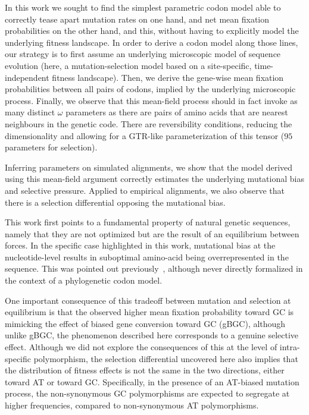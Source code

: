 \documentclass{article}
\begin{document}
In this work we sought to find the simplest parametric codon model able to correctly tease apart mutation rates on one hand, and net mean fixation probabilities on the other hand, and this, without having to explicitly model the underlying fitness landscape.
In order to derive a codon model along those lines, our strategy is to first assume an underlying microscopic model of sequence evolution (here, a mutation-selection model based on a site-specific, time-independent fitness landscape).
Then, we derive the gene-wise mean fixation probabilities between all pairs of codons, implied by the underlying microscopic process.
Finally, we observe that this mean-field process should in fact invoke as many distinct $\omega$ parameters as there are pairs of amino acids that are nearest neighbours in the genetic code.
There are reversibility conditions, reducing the dimensionality and allowing for a GTR-like parameterization of this tensor ($95$ parameters for selection).

Inferring parameters on simulated alignments, we show that the model derived using this mean-field argument correctly estimates the underlying mutational bias and selective pressure.
Applied to empirical alignments, we also observe that there is a selection differential opposing the mutational bias.

This work first points to a fundamental property of natural genetic sequences, namely that they are not optimized but are the result of an equilibrium between forces.
In the specific case highlighted in this work, mutational bias at the nucleotide-level results in suboptimal amino-acid being overrepresented in the sequence.
This was pointed out previously~\citep{Singer2000}, although never directly formalized in the context of a phylogenetic codon model.

One important consequence of this tradeoff between mutation and selection at equilibrium is that the observed higher mean fixation probability toward GC is mimicking the effect of biased gene conversion toward GC ({gBGC}), although unlike {gBGC}, the phenomenon described here corresponds to a genuine selective effect.
Although we did not explore the consequences of this at the level of intra-specific polymorphism, the selection differential uncovered here also implies that the distribution of fitness effects is not the same in the two directions, either toward AT or toward GC.
Specifically, in the presence of an AT-biased mutation process, the {non-synonymous} GC polymorphisms are expected to segregate at higher frequencies, compared to {non-synonymous} AT polymorphisms.
\end{document}

